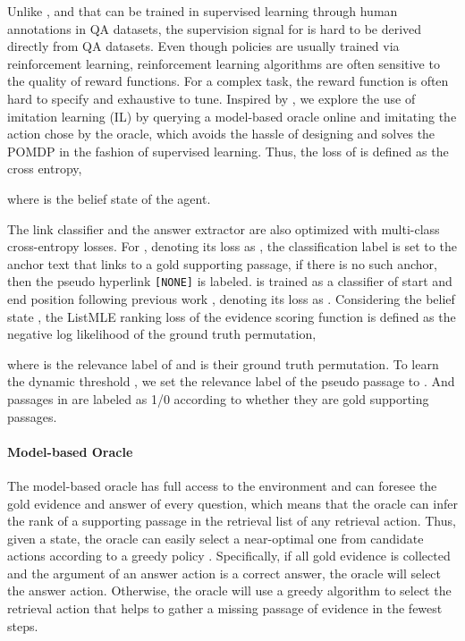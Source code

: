 \documentclass[11pt]{article}
\begin{document}
Unlike ,  and  that can be trained in supervised learning through human annotations in QA datasets, the supervision signal for  is hard to be derived directly from QA datasets.
Even though policies are usually trained via reinforcement learning, reinforcement learning algorithms \citep{sutton2000policy, mnih2015human} are often sensitive to the quality of reward functions. 
For a complex task, the reward function  is often hard to specify and exhaustive to tune.
Inspired by \citet{choudhury2017adaptive}, we explore the use of imitation learning (IL) by querying a model-based oracle online and imitating the action  chose by the oracle, which avoids the hassle of designing  and solves the POMDP in the fashion of supervised learning.
Thus, the loss of  is defined as the cross entropy,

where  is the belief state of the agent.

The link classifier  and the answer extractor  are also optimized with multi-class cross-entropy losses.
For , denoting its loss as , the classification label is set to the anchor text that links to a gold supporting passage, if there is no such anchor, then the pseudo hyperlink \verb|[NONE]| is labeled.
 is trained as a classifier of start and end position following previous work \citep{Clark2020ELECTRA}, denoting its loss as .
Considering the belief state , the ListMLE \citep{10.1145/1390156.1390306} ranking loss of the evidence scoring function  is defined as the negative log likelihood of the ground truth permutation,

where  is the relevance label of  and  is their ground truth permutation.
To learn the dynamic threshold , we set the relevance label of the pseudo passage  to . And passages in  are labeled as 1/0 according to whether they are gold supporting passages.

\paragraph{Model-based Oracle}
The model-based oracle has full access to the environment and can foresee the gold evidence and answer of every question, which means that the oracle can infer the rank of a supporting passage in the retrieval list of any retrieval action.
Thus, given a state, the oracle can easily select a near-optimal one from candidate actions according to a greedy policy .
Specifically, if all gold evidence is collected and the argument of an answer action is a correct answer, the oracle will select the answer action.
Otherwise, the oracle will use a greedy algorithm to select the retrieval action that helps to gather a missing passage of evidence in the fewest steps.
\end{document}
